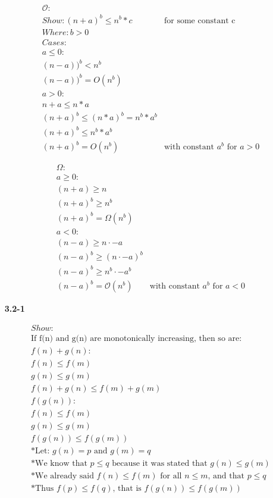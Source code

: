 \documentclass{article}
\begin{document}
\begin{enumerate}
	\begin{align*}
  & \mathcal{O} : \\
  & Show: (n+a)^b \leq n^b * c & \text{for some constant c} \\
  & Where: b > 0  \\
  & Cases: \\
  & a \leq 0: \\
  & (n-a))^b < n^b \\
  & (n-a))^b = O(n^b) \\
  & a > 0: \\
  & n+a \leq n*a \\
  & (n+a)^b \leq (n*a)^b = n^b * a^b \\
  & (n+a)^b \leq n^b * a^b \\
  & (n+a)^b = O(n^b) & \text{with constant $a^b$ for $a > 0$} \\ \\
	\end{align*}
	\begin{align*}
  & \Omega : \\
  & a \geq 0: \\
  & (n + a) \geq n \\
  & (n + a)^b \geq n^b \\
  & (n + a)^b = \Omega(n^b) \\
  & a < 0: \\
  & (n - a) \geq n \cdot -a \\
  & (n - a)^b \geq (n \cdot -a)^b \\
  & (n - a)^b \geq n^b \cdot -a^b \\
  & (n - a)^b = \mathcal{O}(n^b) & \text{with constant $a^b$ for $a < 0$}
	\end{align*}

\item[\textbf{3.2-1}]

	\begin{align*}
  & Show: \\
	& \text{If f(n) and g(n) are monotonically increasing, then so are:} \\
  & f(n) + g(n): \\
    & f(n) \leq f(m) \\
    & g(n) \leq g(m) \\
    & f(n) + g(n) \leq f(m) + g(m) \\
  & f(g(n)): \\
    & f(n) \leq f(m) \\
    & g(n) \leq g(m) \\
    & f(g(n)) \leq f(g(m)) \\
    & * \text{Let: $g(n) = p$ and $g(m) = q$ } \\
    & * \text{We know that $p \leq q$ because it was stated that $g(n) \leq g(m)$} \\
    & * \text{We already said $f(n) \leq f(m)$ for all $n \leq m$, and that $p \leq q$} \\
    & * \text{Thus $f(p) \leq f(q)$, that is $f(g(n)) \leq f(g(m))$}
	\end{align*}


\end{enumerate}
\end{document}
